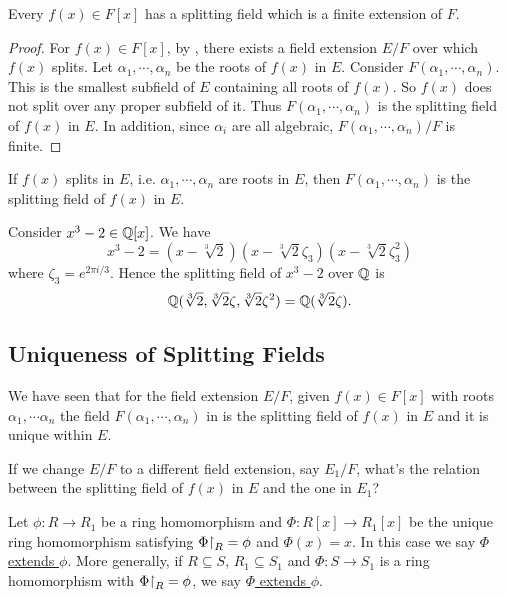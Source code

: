 \documentclass[11pt]{article}
\begin{document}
\begin{theorem}
    Every $f(x)\in F[x]$ has a splitting field which is a finite extension of $F$.
\end{theorem}

\begin{proof}
    For $f(x)\in F[x]$, by , there exists a field extension $E/F$ over which $f(x)$ splits. Let $\alpha_1,\cdots,\alpha_n$ be the roots of $f(x)$ in $E$. Consider $F(\alpha_1,\cdots,\alpha_n)$. This is the smallest subfield of $E$ containing all roots of $f(x)$. So $f(x)$ does not split over any proper subfield of it. Thus $F(\alpha_1,\cdots,\alpha_n)$ is the splitting field of $f(x)$ in $E$. In addition, since $\alpha_i$ are all algebraic, $F(\alpha_1,\cdots,\alpha_n)/F$ is finite.
    
\end{proof}

\begin{remark}
    If $f(x)$ splits in $E$, i.e. $\alpha_1,\cdots,\alpha_n$ are roots in $E$, then $F(\alpha_1,\cdots,\alpha_n)$ is the splitting field of $f(x)$ in $E$.
\end{remark}

\begin{example}
    Consider $x^3-2\in\mathbb{Q}[x]$. We have
    \[x^3-2=(x-\sqrt[3]{2})(x-\sqrt[3]{2}\zeta_3)(x-\sqrt[3]{2}\zeta_3^2)\]
    where $\zeta_3=e^{2\pi i/3}$. Hence the splitting field of $x^3-2$ over $\mathbb{Q}$ is
    \[\mathbb{Q}(\sqrt[3]{2},\sqrt[3]{2}\zeta,\sqrt[3]{2}\zeta^2)=\mathbb{Q}(\sqrt[3]{2}\zeta).\]
\end{example}

\subsection{Uniqueness of Splitting Fields}

We have seen that for the field extension $E/F$, given $f(x)\in F[x]$ with roots $\alpha_1,\cdots\alpha_n$ the field $F(\alpha_1,\cdots,\alpha_n)$ in is the splitting field of $f(x)$ in $E$ and it is unique within $E$.

\begin{question}
    If we change $E/F$ to a different field extension, say $E_1/F$, what's the relation between the splitting field of $f(x)$ in $E$ and the one in $E_1$?
\end{question}

\begin{definition}
    Let $\phi:R\to R_1$ be a ring homomorphism and $\Phi:R[x]\to R_1[x]$ be the unique ring homomorphism satisfying $\Phi{\upharpoonright}_R=\phi$ and $\Phi(x)=x$. In this case we say \ul{$\Phi$ extends $\phi$}. More generally, if $R\subseteq S$, $R_1\subseteq S_1$ and $\Phi:S\to S_1$ is a ring homomorphism with $\Phi{\upharpoonright}_R=\phi$, we say \ul{$\Phi$ extends $\phi$}.
\end{definition}
\end{document}
